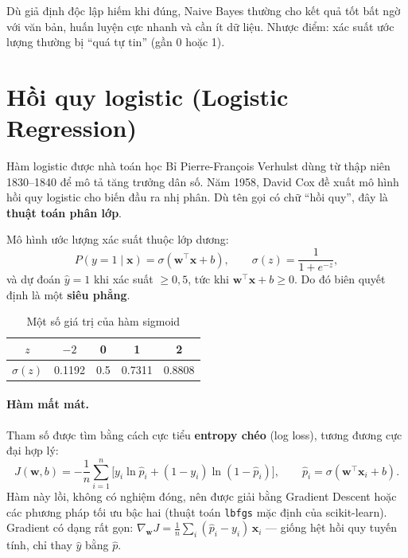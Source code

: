 Dù giả định độc lập hiếm khi đúng, Naive Bayes thường cho kết quả tốt bất ngờ với văn bản, huấn luyện cực nhanh và cần ít dữ liệu. Nhược điểm: xác suất ước lượng thường bị ``quá tự tin'' (gần 0 hoặc 1).

\section{Hồi quy logistic (Logistic Regression)}

Hàm logistic được nhà toán học Bỉ Pierre-François Verhulst dùng từ thập niên 1830--1840 để mô tả tăng trưởng dân số. Năm 1958, David Cox đề xuất mô hình hồi quy logistic cho biến đầu ra nhị phân. Dù tên gọi có chữ ``hồi quy'', đây là \textbf{thuật toán phân lớp}.

\begin{definition}
Mô hình ước lượng xác suất thuộc lớp dương:
\begin{equation}
    P(y = 1 \mid \mathbf{x}) = \sigma(\mathbf{w}^\top\mathbf{x} + b), \qquad \sigma(z) = \frac{1}{1 + e^{-z}},
\end{equation}
và dự đoán $\hat{y} = 1$ khi xác suất $\geq 0{,}5$, tức khi $\mathbf{w}^\top\mathbf{x} + b \geq 0$. Do đó biên quyết định là một \textbf{siêu phẳng}.
\end{definition}

\begin{table}[H]
\centering
\begin{tabular}{|c|c|c|c|c|}
\hline
$z$ & $-2$ & 0 & 1 & 2 \\ \hline
$\sigma(z)$ & 0.1192 & 0.5 & 0.7311 & 0.8808 \\ \hline
\end{tabular}
\caption{Một số giá trị của hàm sigmoid}
\end{table}

\paragraph{Hàm mất mát.} Tham số được tìm bằng cách cực tiểu \textbf{entropy chéo} (log loss), tương đương cực đại hợp lý:
\begin{equation}
    J(\mathbf{w}, b) = -\frac{1}{n}\sum_{i=1}^{n}\Big[y_i \ln \hat{p}_i + (1 - y_i)\ln(1 - \hat{p}_i)\Big], \qquad \hat{p}_i = \sigma(\mathbf{w}^\top\mathbf{x}_i + b).
\end{equation}
Hàm này lồi, không có nghiệm đóng, nên được giải bằng Gradient Descent hoặc các phương pháp tối ưu bậc hai (thuật toán \texttt{lbfgs} mặc định của scikit-learn). Gradient có dạng rất gọn: $\nabla_{\mathbf{w}} J = \frac{1}{n}\sum_i (\hat{p}_i - y_i)\,\mathbf{x}_i$ --- giống hệt hồi quy tuyến tính, chỉ thay $\hat{y}$ bằng $\hat{p}$.

